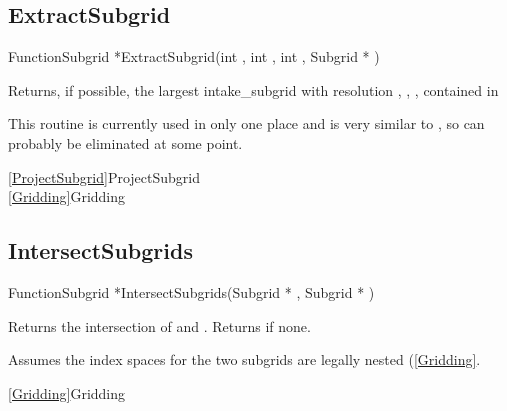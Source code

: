 \newpage
\subsection{ExtractSubgrid}
\label{ExtractSubgrid}


\begin{deftypefn}{Function}{Subgrid *}{ExtractSubgrid}(int , int , int , {Subgrid *} )

\DESCRIPTION
Returns, if possible, the largest intake_subgrid with resolution
, , ,
contained in 

\NOTES
This routine is currently used in only one place and is very similar
to , so can probably be eliminated at some point.

\SEEALSO
\vref{ProjectSubgrid}{ProjectSubgrid}\\
\vref{Gridding}{Gridding}

\end{deftypefn}


\newpage
\subsection{IntersectSubgrids}
\label{IntersectSubgrids}


\begin{deftypefn}{Function}{Subgrid *}{IntersectSubgrids}({Subgrid *} , {Subgrid *} )

\DESCRIPTION
Returns the intersection of  and .
Returns  if none.

\NOTES
Assumes the index spaces for the two subgrids are legally nested
(\ref{Gridding}.

\SEEALSO
\vref{Gridding}{Gridding}

\end{deftypefn}

